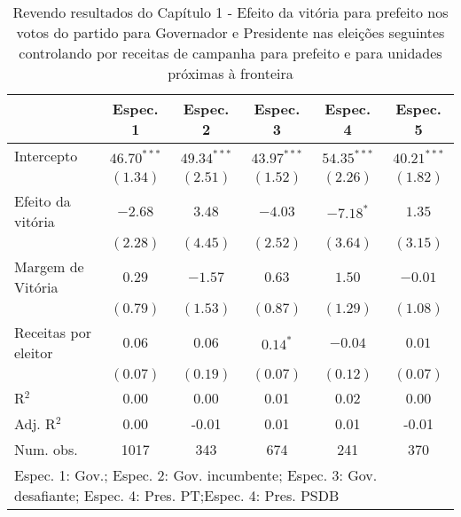 
\begin{table}
\caption{Revendo resultados do Capítulo 1 - Efeito da vitória para prefeito nos votos do partido para Governador e Presidente nas eleições seguintes controlando por receitas de campanha para prefeito e para unidades próximas à fronteira}
\begin{center}
\begin{tabular}{l c c c c c }
\hline
                     & Espec. 1 & Espec. 2 & Espec. 3 & Espec. 4 & Espec. 5 \\
\hline
Intercepto           & $46.70^{***}$ & $49.34^{***}$ & $43.97^{***}$ & $54.35^{***}$ & $40.21^{***}$ \\
                     & $(1.34)$      & $(2.51)$      & $(1.52)$      & $(2.26)$      & $(1.82)$      \\
Efeito da vitória    & $-2.68$       & $3.48$        & $-4.03$       & $-7.18^{*}$   & $1.35$        \\
                     & $(2.28)$      & $(4.45)$      & $(2.52)$      & $(3.64)$      & $(3.15)$      \\
Margem de Vitória    & $0.29$        & $-1.57$       & $0.63$        & $1.50$        & $-0.01$       \\
                     & $(0.79)$      & $(1.53)$      & $(0.87)$      & $(1.29)$      & $(1.08)$      \\
Receitas por eleitor & $0.06$        & $0.06$        & $0.14^{*}$    & $-0.04$       & $0.01$        \\
                     & $(0.07)$      & $(0.19)$      & $(0.07)$      & $(0.12)$      & $(0.07)$      \\
\hline
R$^2$                & 0.00          & 0.00          & 0.01          & 0.02          & 0.00          \\
Adj. R$^2$           & 0.00          & -0.01         & 0.01          & 0.01          & -0.01         \\
Num. obs.            & 1017          & 343           & 674           & 241           & 370           \\
\hline
\multicolumn{6}{l}{\scriptsize{Espec. 1: Gov.; Espec. 2: Gov. incumbente; Espec. 3: Gov. desafiante; Espec. 4: Pres. PT;Espec. 4: Pres. PSDB}}
\end{tabular}
\label{tab:c4t5}
\end{center}
\end{table}

